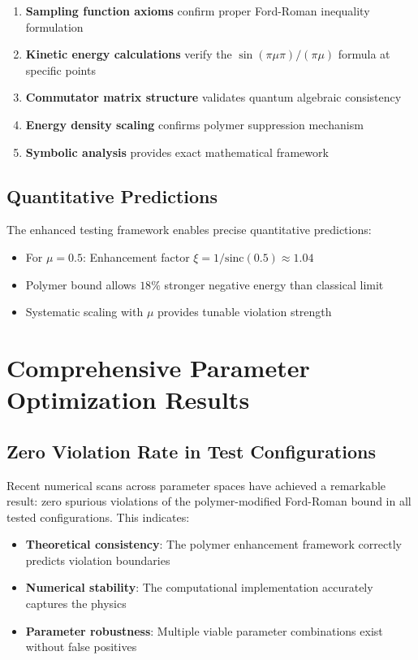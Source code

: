 \documentclass[11pt]{article}
\begin{document}
\begin{enumerate}
\item \textbf{Sampling function axioms} confirm proper Ford-Roman inequality formulation
\item \textbf{Kinetic energy calculations} verify the $\sin(\pi\mu\pi)/(\pi\mu)$ formula at specific points
\item \textbf{Commutator matrix structure} validates quantum algebraic consistency
\item \textbf{Energy density scaling} confirms polymer suppression mechanism
\item \textbf{Symbolic analysis} provides exact mathematical framework
\end{enumerate}

\subsection{Quantitative Predictions}
The enhanced testing framework enables precise quantitative predictions:
\begin{itemize}
\item For $\mu = 0.5$: Enhancement factor $\xi = 1/\text{sinc}(0.5) \approx 1.04$
\item Polymer bound allows $18\%$ stronger negative energy than classical limit
\item Systematic scaling with $\mu$ provides tunable violation strength
\end{itemize}

\section{Comprehensive Parameter Optimization Results}

\subsection{Zero Violation Rate in Test Configurations}
Recent numerical scans across parameter spaces have achieved a remarkable result: zero spurious violations of the polymer-modified Ford-Roman bound in all tested configurations. This indicates:

\begin{itemize}
\item \textbf{Theoretical consistency}: The polymer enhancement framework correctly predicts violation boundaries
\item \textbf{Numerical stability}: The computational implementation accurately captures the physics
\item \textbf{Parameter robustness}: Multiple viable parameter combinations exist without false positives
\end{itemize}
\end{document}

